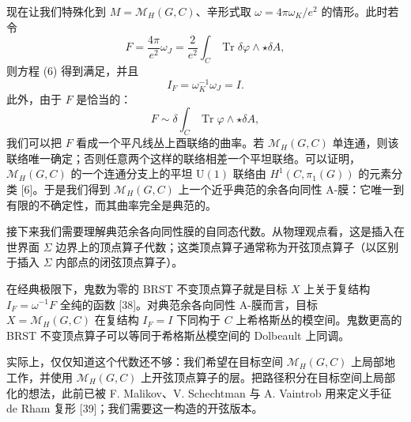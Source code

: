 \documentclass[11pt,a4paper,UTF8]{ctexart}
\begin{document}
现在让我们特殊化到 $M=\mathcal{M}_{H}(G,C)$、辛形式取 $\omega=4\pi\omega_{K}/e^{2}$ 的情形。此时若令
\[
    F=\frac{4\pi}{e^{2}}\omega_{J}=\frac{2}{e^{2}}\int_{C}\operatorname{Tr}\delta\varphi\wedge\star\delta A,
\]
则方程 (6) 得到满足，并且
\[
    I_{F}=\omega_{K}^{-1}\omega_{J}=I.
\]
此外，由于 $F$ 是恰当的：
\[
    F\sim\delta\int_{C}\operatorname{Tr}\varphi\wedge\star\delta A,
\]
我们可以把 $F$ 看成一个平凡线丛上酉联络的曲率。若 $\mathcal{M}_{H}(G,C)$ 单连通，则该联络唯一确定；否则任意两个这样的联络相差一个平坦联络。可以证明，$\mathcal{M}_{H}(G,C)$ 的一个连通分支上的平坦 $\mathrm{U}(1)$ 联络由 $H^{1}(C,\pi_{1}(G))$ 的元素分类 [6]。于是我们得到 $\mathcal{M}_{H}(G,C)$ 上一个近乎典范的余各向同性 A-膜：它唯一到有限的不确定性，而其曲率完全是典范的。



接下来我们需要理解典范余各向同性膜的自同态代数。从物理观点看，这是插入在世界面 $\Sigma$ 边界上的顶点算子代数；这类顶点算子通常称为开弦顶点算子（以区别于插入 $\Sigma$ 内部点的闭弦顶点算子）。

在经典极限下，鬼数为零的 BRST 不变顶点算子就是目标 $X$ 上关于复结构 $I_{F}=\omega^{-1}F$ 全纯的函数 [38]。对典范余各向同性 A-膜而言，目标 $X=\mathcal{M}_{H}(G,C)$ 在复结构 $I_{F}=I$ 下同构于 $C$ 上希格斯丛的模空间。鬼数更高的 BRST 不变顶点算子可以等同于希格斯丛模空间的 Dolbeault 上同调。


实际上，仅仅知道这个代数还不够：我们希望在目标空间 $\mathcal{M}_{H}(G,C)$ 上局部地工作，并使用 $\mathcal{M}_{H}(G,C)$ 上开弦顶点算子的层。把路径积分在目标空间上局部化的想法，此前已被 F. Malikov、V. Schechtman 与 A. Vaintrob 用来定义手征 de Rham 复形 [39]；我们需要这一构造的开弦版本。
\end{document}
